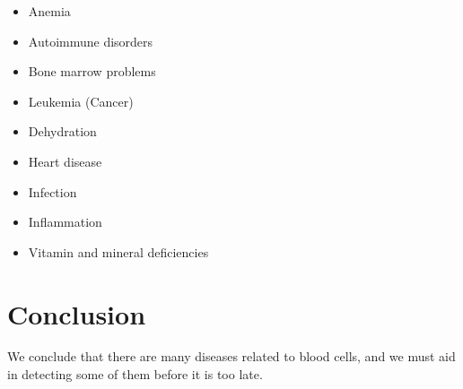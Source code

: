 \begin{itemize}
  \item Anemia
  \vspace{-0.05in}
  \item Autoimmune disorders
  \vspace{-0.05in}
  \item Bone marrow problems
  \vspace{-0.05in}
  \item Leukemia (Cancer)
  \vspace{-0.05in}
  \item Dehydration
  \vspace{-0.05in}
  \item Heart disease
  \vspace{-0.05in}
  \item Infection
  \vspace{-0.05in}
  \item Inflammation
  \vspace{-0.05in}
  \item Vitamin and mineral deficiencies
  \vspace{-0.05in}
\end{itemize}

\section{Conclusion}
\hspace{\parindent}
We conclude that there are many diseases related to blood cells, and we must aid in detecting some of them before it is too late.

